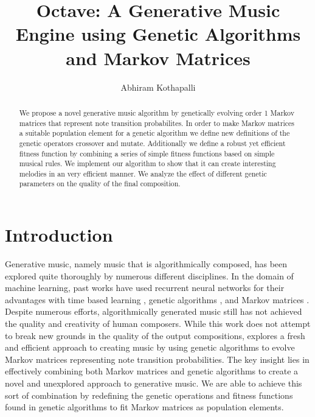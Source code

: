 \documentclass{article}
\title{Octave: A Generative Music Engine using Genetic Algorithms and Markov Matrices}
\author{Abhiram Kothapalli}
\date{}
\begin{document}
\maketitle

\begin{abstract}
We propose a novel generative music algorithm by genetically evolving order 1 Markov matrices that represent note transition probabilites. In order to make Markov matrices a suitable population element for a genetic algorithm we define new definitions of the genetic operators crossover and mutate. Additionally we define a robust yet efficient fitness function by combining a series of simple fitness functions based on simple musical rules. We implement our algorithm to show that it can create interesting melodies in an very efficient manner. We analyze the effect of different genetic parameters on the quality of the final composition.
\end{abstract}

\section{Introduction}

Generative music, namely music that is algorithmically composed, has been explored quite thoroughly by numerous different disciplines. In the domain of machine learning, past works have used recurrent neural networks for their advantages with time based learning \cite{akten9realtime, 938515, DBLP:journals/corr/Graves13}, genetic algorithms \cite{eigenfeldt2015generative, miranda2001composing}, and Markov matrices \cite{fernandez2013ai}. Despite numerous efforts, algorithmically generated music still has not achieved the quality and creativity of human composers. While this work does not attempt to break new grounds in the quality of the output compositions, explores a fresh and efficient approach to creating music by using genetic algorithms to evolve Markov matrices representing note transition probabilities. The key insight lies in effectively combining both Markov matrices and genetic algorithms to create a novel and unexplored approach to generative music. We are able to achieve this sort of combination by redefining the genetic operations and fitness functions found in genetic algorithms to fit Markov matrices as population elements.
\end{document}
